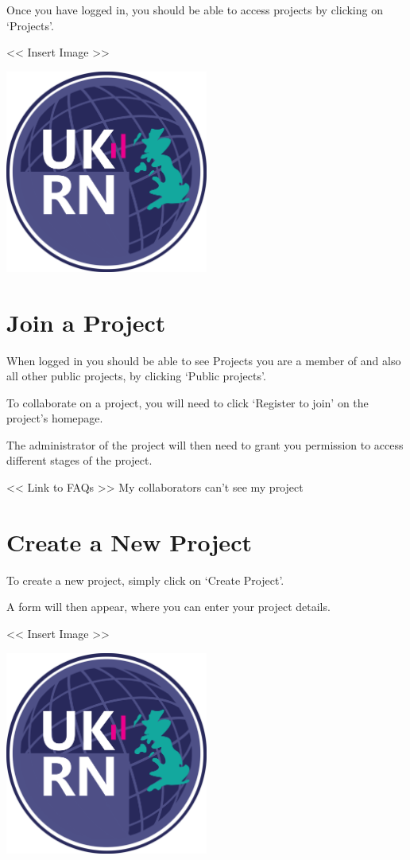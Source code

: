 \documentclass[
]{book}
\begin{document}
Once you have logged in, you should be able to access projects by clicking on `Projects'.

\textless{}\textless{} Insert Image \textgreater{}\textgreater{}

\includegraphics[width=0.5\textwidth,height=0.5\textheight]{figs/evidence-triangle.png}

\hypertarget{join}{%
\chapter{Join a Project}\label{join}}

When logged in you should be able to see Projects you are a member of and also all other public projects, by clicking `Public projects'.

To collaborate on a project, you will need to click `Register to join' on the project's homepage.

The administrator of the project will then need to grant you permission to access different stages of the project.

\textless{}\textless{} Link to FAQs \textgreater{}\textgreater{}
My collaborators can't see my project

\hypertarget{createProject}{%
\chapter{Create a New Project}\label{createProject}}

To create a new project, simply click on `Create Project'.

A form will then appear, where you can enter your project details.

\textless{}\textless{} Insert Image \textgreater{}\textgreater{}

\includegraphics[width=0.5\textwidth,height=0.5\textheight]{figs/evidence-triangle.png}
\end{document}
